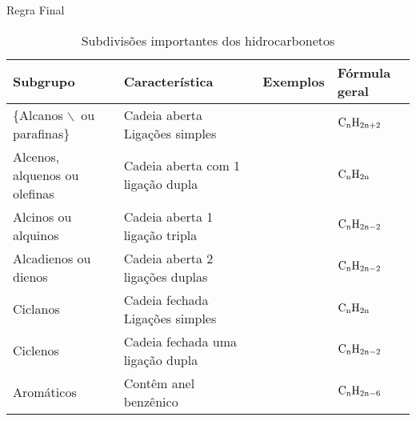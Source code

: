 \documentclass{beamer}
\begin{document}
\begin{frame}[allowframebreaks]{Regra Final}
\begin{table}[htbp]
\caption{\label{tab:org3889c0e}Subdivisões importantes dos hidrocarbonetos}
\begin{supertabular}{BBLB}
\hline
    {\bfseries Subgrupo}  &   {\bfseries Característica}  &   {\bfseries Exemplos}  &   {\bfseries Fórmula geral} \\[0pt]
\hline
\{Alcanos $\backslash$\ ou parafinas\} & Cadeia aberta Ligações simples &  \quad {}\qquad & \(\rm C_nH_{2n+2}\)\\[0pt]
\hline
Alcenos, alquenos ou olefinas & Cadeia aberta com 1 ligação dupla &  \quad {} & \(\rm C_nH_{2n}\)\\[0pt]
\hline
Alcinos ou alquinos & Cadeia aberta 1 ligação tripla &  \quad {} & \(\rm C_nH_{2n-2}\)\\[0pt]
\hline
Alcadienos ou dienos & Cadeia aberta 2 ligações duplas & \qquad {} & \(\rm C_nH_{2n-2}\)\\[0pt]
\hline
Ciclanos & Cadeia fechada Ligações simples &  \qquad {} & \(\rm C_nH_{2n}\)\\[0pt]
\hline
Ciclenos & Cadeia fechada uma ligação dupla &  \qquad {} & \(\rm C_nH_{2n-2}\)\\[0pt]
\hline
Aromáticos & Contêm anel benzênico &  \qquad  {} & \(\rm C_nH_{2n-6}\)\\[0pt]
\end{supertabular}
\end{table}
\end{frame}
\end{document}
